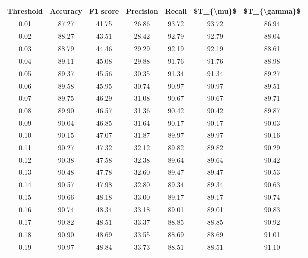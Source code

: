\begin{tabular}{|c|c|c|c|c|c|c|}
\hline
 Threshold &  Accuracy &  F1 score &  Precision &  Recall &  \$T\_\{\textbackslash mu\}\$ &  \$T\_\{\textbackslash gamma\}\$ \\
\hline
      0.01 &     87.27 &     41.75 &      26.86 &   93.72 &      93.72 &         86.94 \\
      0.02 &     88.27 &     43.51 &      28.42 &   92.79 &      92.79 &         88.04 \\
      0.03 &     88.79 &     44.46 &      29.29 &   92.19 &      92.19 &         88.61 \\
      0.04 &     89.11 &     45.08 &      29.88 &   91.76 &      91.76 &         88.98 \\
      0.05 &     89.37 &     45.56 &      30.35 &   91.34 &      91.34 &         89.27 \\
      0.06 &     89.58 &     45.95 &      30.74 &   90.97 &      90.97 &         89.51 \\
      0.07 &     89.75 &     46.29 &      31.08 &   90.67 &      90.67 &         89.71 \\
      0.08 &     89.90 &     46.57 &      31.36 &   90.42 &      90.42 &         89.87 \\
      0.09 &     90.04 &     46.85 &      31.64 &   90.17 &      90.17 &         90.03 \\
      0.10 &     90.15 &     47.07 &      31.87 &   89.97 &      89.97 &         90.16 \\
      0.11 &     90.27 &     47.32 &      32.12 &   89.82 &      89.82 &         90.29 \\
      0.12 &     90.38 &     47.58 &      32.38 &   89.64 &      89.64 &         90.42 \\
      0.13 &     90.48 &     47.78 &      32.60 &   89.47 &      89.47 &         90.53 \\
      0.14 &     90.57 &     47.98 &      32.80 &   89.34 &      89.34 &         90.63 \\
      0.15 &     90.66 &     48.18 &      33.00 &   89.17 &      89.17 &         90.74 \\
      0.16 &     90.74 &     48.34 &      33.18 &   89.01 &      89.01 &         90.83 \\
      0.17 &     90.82 &     48.51 &      33.37 &   88.85 &      88.85 &         90.92 \\
      0.18 &     90.90 &     48.69 &      33.55 &   88.69 &      88.69 &         91.01 \\
      0.19 &     90.97 &     48.84 &      33.73 &   88.51 &      88.51 &         91.10 \\

\end{tabular}
